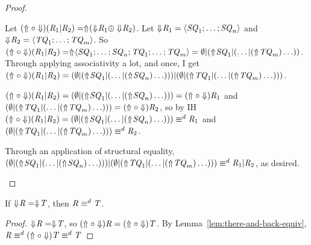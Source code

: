 \documentclass[numbers,10pt,preprint\ifanon ,nocopyrightspace\fi]{sigplanconf}
\begin{document}
\begin{proof}
  \begin{case}[\OrRegexType{}]
    Let $(\Uparrow \circ \Downarrow)(\mathit{R}_1 | \mathit{R}_2) =
    \Uparrow\mkern-4mu (\Downarrow\mkern-4mu \mathit{R}_1 \oplus \Downarrow\mkern-4mu \mathit{R}_2)$.
    Let $\Downarrow\mkern-4mu \mathit{R}_1 = \langle\mathit{SQ}_1;\ldots;\mathit{SQ}_n\rangle$ and
    $\Downarrow\mkern-4mu \mathit{R}_2 = \langle\mathit{TQ}_1;\ldots;\mathit{TQ}_m\rangle$.
    So
    $(\Uparrow \circ \Downarrow)(\mathit{R}_1 | \mathit{R}_2) =
    \Uparrow\mkern-4mu \langle\mathit{SQ}_1;\ldots;\mathit{SQ}_n;
        \mathit{TQ}_1;\ldots;\mathit{TQ}_m\rangle =
    \emptyset | (\Uparrow\mkern-4mu \mathit{SQ}_1 | (
    \ldots | (\Uparrow\mkern-4mu \mathit{TQ}_m)\ldots))$.
    Through applying associativity a lot, and \OrIdentityRule{} once, I get
    $(\Uparrow \circ \Downarrow)(\mathit{R}_1 | \mathit{R}_2) =
    (\emptyset | (\Uparrow\mkern-4mu \mathit{SQ}_1 | (\ldots |
    (\Uparrow\mkern-4mu \mathit{SQ}_n)\ldots)))
    |
    (\emptyset | (\Uparrow\mkern-4mu \mathit{TQ}_1 | (\ldots |
    (\Uparrow\mkern-4mu \mathit{TQ}_m)\ldots)))$.

    $(\Uparrow \circ \Downarrow)(\mathit{R}_1 | \mathit{R}_2) =
    (\emptyset | (\Uparrow\mkern-4mu \mathit{SQ}_1 | (\ldots |
    (\Uparrow\mkern-4mu \mathit{SQ}_n)\ldots))) =
    (\Uparrow \circ \Downarrow)\mathit{R}_1$
    and $(\emptyset | (\Uparrow\mkern-4mu \mathit{TQ}_1 | (\ldots |
    (\Uparrow\mkern-4mu \mathit{TQ}_m)\ldots))) =
    (\Uparrow \circ \Downarrow)\mathit{R}_2$, so by IH
    $(\Uparrow \circ \Downarrow)(\mathit{R}_1 | \mathit{R}_2) =
    (\emptyset | (\Uparrow\mkern-4mu \mathit{SQ}_1 | (\ldots |
    (\Uparrow\mkern-4mu \mathit{SQ}_n)\ldots))) \equiv^d
    \mathit{R}_1$
    and $(\emptyset | (\Uparrow\mkern-4mu \mathit{TQ}_1 | (\ldots |
    (\Uparrow\mkern-4mu \mathit{TQ}_m)\ldots))) \equiv^d
    \mathit{R}_2$.

    Through an application of structural \OrRegexType{} equality,
    $(\emptyset | (\Uparrow\mkern-4mu \mathit{SQ}_1 | (\ldots |
    (\Uparrow\mkern-4mu \mathit{SQ}_n)\ldots)))
    |
    (\emptyset | (\Uparrow\mkern-4mu \mathit{TQ}_1 | (\ldots |
    (\Uparrow\mkern-4mu \mathit{TQ}_m)\ldots))) \equiv^d
    \mathit{R}_1 | \mathit{R}_2$, as desired.
  \end{case}
\end{proof}

\begin{lemma}
  \label{lem:preimage-equiv}
  If $\Downarrow\mkern-4mu \mathit{R} = \Downarrow\mkern-4mu \mathit{T}$, then $\mathit{R}
  \equiv^d \mathit{T}$.
\end{lemma}
\begin{proof}
  $\Downarrow\mkern-4mu \mathit{R} = \Downarrow\mkern-4mu \mathit{T}$, so $(\Uparrow \circ
  \Downarrow) \mathit{R} = (\Uparrow \circ \Downarrow) \mathit{T}$.
  By Lemma~\ref{lem:there-and-back-equiv},
  $\mathit{R} \equiv^d (\Uparrow \circ \Downarrow) \mathit{T}
  \equiv^d \mathit{T}$
\end{proof}
\end{document}
